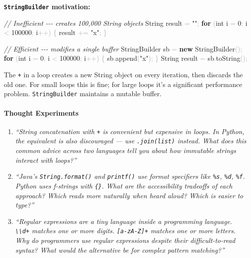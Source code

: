 \documentclass[
  justified,
  openright,
]{tufte-book}
\let\paragraph\paragraph
\newcommand{\KeywordTok}[1]{\textcolor{CodeKeyword}{\textbf{#1}}}  %
\newcommand{\StringTok}[1]{\textcolor{CodeString}{#1}}              %
\newcommand{\CommentTok}[1]{\textcolor{CodeComment}{\textit{#1}}}  %
\newcommand{\CodeNumTok}[1]{\textcolor{CodeNumber}{#1}}             %
\newcommand{\CodeFuncTok}[1]{\textcolor{CodeKeyword}{#1}}           %
\newcommand{\CodeTypeTok}[1]{\textcolor{CodeType}{#1}}              %
\newcommand{\OperatorTok}[1]{\textcolor{DarkGray}{#1}}              %
\newenvironment{Shaded}{%
  \begin{mdframed}[style=TufteCode]%
}{%
  \end{mdframed}%
}
\let\paragraph\paragraph
\begin{document}
\textbf{\texttt{StringBuilder} motivation:}

\begin{Shaded}
\begin{Highlighting}[]
\CommentTok{// Inefficient {-}{-}{-} creates 100,000 String objects}
String result \OperatorTok{=} \StringTok{""}\OperatorTok{;}
\KeywordTok{for} \OperatorTok{(}\CodeTypeTok{int} i \OperatorTok{=} \CodeNumTok{0}\OperatorTok{;} i \OperatorTok{\textless{}} \CodeNumTok{100000}\OperatorTok{;} i\OperatorTok{++)} \OperatorTok{\{}
    result \OperatorTok{+=} \StringTok{"x"}\OperatorTok{;}
\OperatorTok{\}}
 
\CommentTok{// Efficient {-}{-}{-} modifies a single buffer}
StringBuilder sb \OperatorTok{=} \KeywordTok{new} StringBuilder\OperatorTok{();}
\KeywordTok{for} \OperatorTok{(}\CodeTypeTok{int} i \OperatorTok{=} \CodeNumTok{0}\OperatorTok{;} i \OperatorTok{\textless{}} \CodeNumTok{100000}\OperatorTok{;} i\OperatorTok{++)} \OperatorTok{\{}
    sb\OperatorTok{.}\CodeFuncTok{append}\OperatorTok{(}\StringTok{"x"}\OperatorTok{);}
\OperatorTok{\}}
String result \OperatorTok{=} sb\OperatorTok{.}\CodeFuncTok{toString}\OperatorTok{();}
\end{Highlighting}
\end{Shaded}

The \texttt{+} in a loop creates a new String object on every iteration,
then discards the old one. For small loops this is fine; for large loops
it's a significant performance problem. \texttt{StringBuilder} maintains
a mutable buffer.

\paragraph{Thought Experiments}\label{thought-experiments-37}

\begin{enumerate}
\def\labelenumi{\arabic{enumi}.}
\item
  \emph{``String concatenation with \texttt{+} is convenient but
  expensive in loops. In Python, the equivalent is also discouraged ---
  use \texttt{\textquotesingle{}\textquotesingle{}.join(list)} instead.
  What does this common advice across two languages tell you about how
  immutable strings interact with loops?''}
\item
  \emph{``Java's \texttt{String.format()} and \texttt{printf()} use
  format specifiers like \texttt{\%s}, \texttt{\%d}, \texttt{\%f}.
  Python uses f-strings with \texttt{\{\}}. What are the accessibility
  tradeoffs of each approach? Which reads more naturally when heard
  aloud? Which is easier to type?''}
\item
  \emph{``Regular expressions are a tiny language inside a programming
  language. \texttt{\textbackslash{}\textbackslash{}d+} matches one or
  more digits. \texttt{{[}a-zA-Z{]}+} matches one or more letters. Why
  do programmers use regular expressions despite their difficult-to-read
  syntax? What would the alternative be for complex pattern matching?''}
\end{enumerate}
\end{document}
